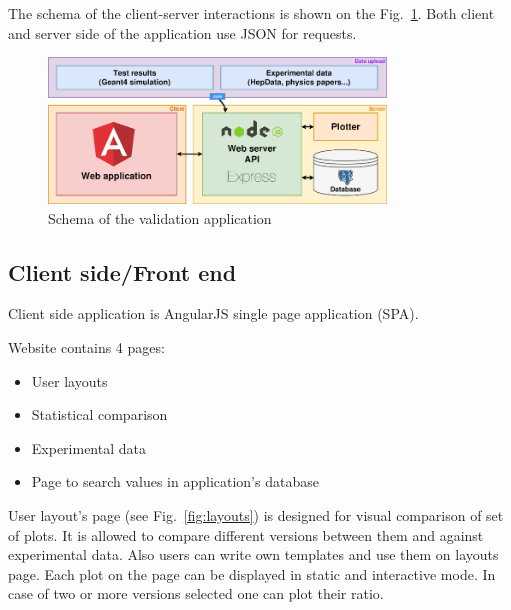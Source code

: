 The schema of the client-server interactions is shown on the Fig.~\ref{fig:schema}. Both client and server side of the application use JSON for requests.

\begin{figure}[h]
    \centering
    \includegraphics[width=0.8\textwidth,clip]{schema.png}
    \caption{Schema of the validation application}
    \label{fig:schema}
\end{figure}

\subsection{Client side/Front end}
\label{sec-webapplication-client}

Client side application is AngularJS single page application (SPA). 


Website contains 4 pages:

\begin{itemize}
    \item User layouts
    \item Statistical comparison
    \item Experimental data
    \item Page to search values in application's database
\end{itemize}

User layout's page (see Fig.~\ref{fig:layouts}) is designed for visual comparison of set of plots. It is allowed to compare different versions between them and against experimental data. Also users can write own templates and use them on layouts page. Each plot on the page can be displayed in static and interactive mode. In case of two or more versions selected one can plot their ratio.

